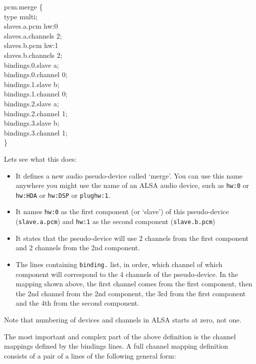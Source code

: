 \documentclass[10pt,a4paper]{book}
\begin{document}
\begin{enumerate}
\begin{itemize}
\begin{listing}
pcm.merge \{\\
    type multi;\\
    slaves.a.pcm hw:0\\
    slaves.a.channels 2;\\
    slaves.b.pcm hw:1\\
    slaves.b.channels 2;\\
    bindings.0.slave a;\\
    bindings.0.channel 0;\\
    bindings.1.slave b;\\
    bindings.1.channel 0;\\
    bindings.2.slave a;\\
    bindings.2.channel 1;\\
    bindings.3.slave b;\\
    bindings.3.channel 1;\\
\}\\
\end{listing}

Lets see what this does:

\begin{itemize}

\item It defines a new audio pseudo-device called `merge'. You can use
  this name anywhere you might use the name of an ALSA audio device,
  such as \texttt{hw:0} or \texttt{hw:HDA} or \texttt{hw:DSP} or
  \texttt{plughw:1}.
\item It names \texttt{hw:0} as the first component (or `slave') of
  this pseudo-device (\texttt{slave.a.pcm}) and \texttt{hw:1} as the
  second component (\texttt{slave.b.pcm})
\item It states that the pseudo-device will use 2 channels from the
  first component and 2 channels from the 2nd component.
\item The lines containing \texttt{binding.} list, in order, which
  channel of which component will correspond to the 4 channels of the
  pseudo-device. In the mapping shown above, the first channel comes
  from the first component, then the 2nd channel from the 2nd
  component, the 3rd from the first component and the 4th from the
  second component.

\end{itemize}

Note that numbering of devices and channels in ALSA starts at zero,
not one.

The most important and complex part of the above definition is the
channel mappings defined by the bindings lines. A full channel mapping
definition consists of a pair of a lines of the following general
form:


\end{itemize}
\end{enumerate}
\end{document}
